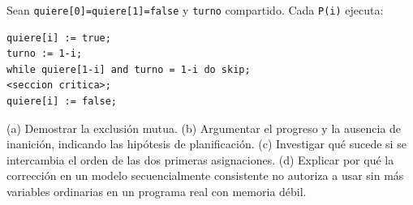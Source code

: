 \documentclass[11pt,a4paper,oneside]{report}
\begin{document}
\begin{ejercicio}
Sean \texttt{quiere[0]=quiere[1]=false} y \texttt{turno} compartido. Cada \texttt{P(i)} ejecuta:
\begin{lstlisting}
quiere[i] := true;
turno := 1-i;
while quiere[1-i] and turno = 1-i do skip;
<seccion critica>;
quiere[i] := false;
\end{lstlisting}
(a) Demostrar la exclusión mutua. (b) Argumentar el progreso y la ausencia de inanición, indicando las hipótesis
de planificación. (c) Investigar qué sucede si se intercambia el orden de las dos primeras asignaciones. (d)
Explicar por qué la corrección en un modelo secuencialmente consistente no autoriza a usar sin más variables
ordinarias en un programa real con memoria débil.
\end{ejercicio}
\end{document}
